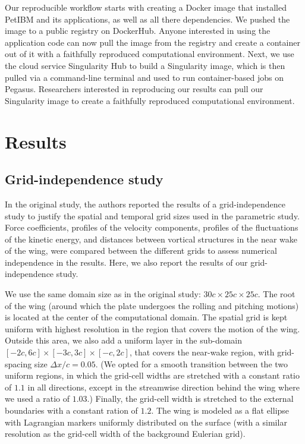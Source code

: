 Our reproducible workflow starts with creating a Docker image that installed PetIBM and its applications, as well as all there dependencies.
We pushed the image to a public registry on DockerHub.
Anyone interested in using the application code can now pull the image from the registry and create a container out of it with a faithfully reproduced computational environment.
Next, we use the cloud service Singularity Hub to build a Singularity image, which is then pulled via a command-line terminal and used to run container-based jobs on Pegasus.
Researchers interested in reproducing our results can pull our Singularity image to create a faithfully reproduced computational environment.

\section{Results}

\subsection{Grid-independence study}

In the original study, the authors reported the results of a grid-independence study to justify the spatial and temporal grid sizes used in the parametric study.
Force coefficients, profiles of the velocity components, profiles of the fluctuations of the kinetic energy, and distances between vortical structures in the near wake of the wing, were compared between the different grids to assess numerical independence in the results.
Here, we also report the results of our grid-independence study.

We use the same domain size as in the original study: $30c \times 25c \times 25c$.
The root of the wing (around which the plate undergoes the rolling and pitching motions) is located at the center of the computational domain.
The spatial grid is kept uniform with highest resolution in the region that covers the motion of the wing.
Outside this area, we also add a uniform layer in the sub-domain $\left[ -2c, 6c \right] \times \left[ -3c, 3c \right] \times \left[ -c, 2c \right]$, that covers the near-wake region, with grid-spacing size $\Delta x / c = 0.05$.
(We opted for a smooth transition between the two uniform regions, in which the grid-cell widths are stretched with a constant ratio of $1.1$ in all directions, except in the streamwise direction behind the wing where we used a ratio of $1.03$.)
Finally, the grid-cell width is stretched to the external boundaries with a constant ration of $1.2$.
The wing is modeled as a flat ellipse with Lagrangian markers uniformly distributed on the surface (with a similar resolution as the grid-cell width of the background Eulerian grid).

